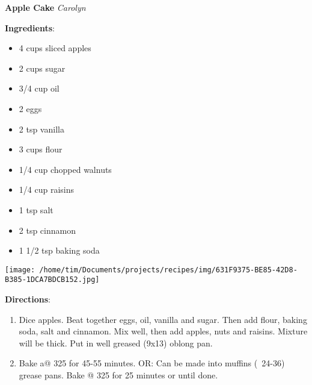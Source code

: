 \documentclass[11pt, twoside, openany]{book}
\begin{document}
\noindent\begin{minipage}[t]{\linewidth}%
{\Large\textbf{Apple Cake}} \label{apple-cake}\hfill\textit{Carolyn}\\
\noindent\begin{minipage}[t]{0.78\linewidth}%
\textbf{Ingredients}:\vspace{-3mm}
\begin{multicols}{2}
\begin{itemize}\setlength\itemsep{-1mm}
\item 4 cups sliced apples
\item 2 cups sugar
\item 3/4 cup oil
\item 2 eggs
\item 2 tsp vanilla
\item 3 cups flour
\item 1/4 cup chopped walnuts
\item 1/4 cup raisins
\item 1 tsp salt
\item 2 tsp cinnamon
\item 1 1/2 tsp baking soda
\end{itemize}
\end{multicols}
\end{minipage}
\noindent\begin{minipage}[t]{0.18\linewidth}
\centering \strut\vspace*{-\baselineskip}\newline
\texttt{[image: /home/tim/Documents/projects/recipes/img/631F9375-BE85-42D8-B385-1DCA7BDCB152.jpg]}\\
\end{minipage}\vspace{3mm}
\textbf{Directions}:
\vspace{-3mm}\begin{enumerate}\setlength\itemsep{-1mm}
\item Dice apples. Beat together eggs, oil, vanilla and sugar. Then add flour, baking soda, salt and cinnamon. Mix well, then add apples, nuts and raisins. Mixture will be thick. Put in well greased (9x13) oblong pan. 
\item Bake a@ 325 for 45-55 minutes. 
OR:
Can be made into muffins (~24-36) grease pans. Bake @ 325 for 25 minutes or until done.
\end{enumerate}
\end{minipage}\vspace{8mm}
\end{document}
